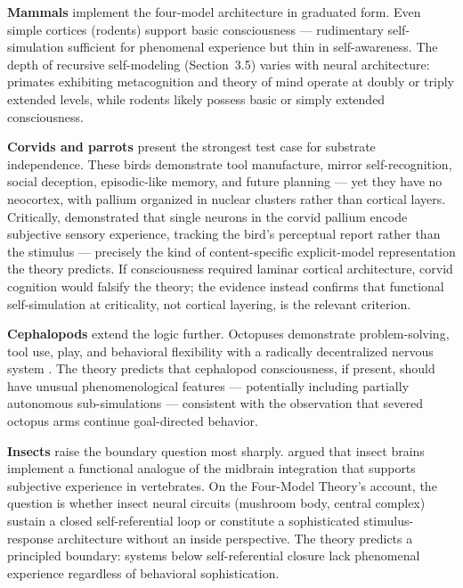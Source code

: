 \documentclass[12pt]{article}
\begin{document}
\textbf{Mammals} implement the four-model architecture in graduated form. Even simple cortices (rodents) support basic consciousness --- rudimentary self-simulation sufficient for phenomenal experience but thin in self-awareness. The depth of recursive self-modeling (Section~3.5) varies with neural architecture: primates exhibiting metacognition and theory of mind operate at doubly or triply extended levels, while rodents likely possess basic or simply extended consciousness.

\textbf{Corvids and parrots} present the strongest test case for substrate independence. These birds demonstrate tool manufacture, mirror self-recognition, social deception, episodic-like memory, and future planning \citep{Gunturkun2016} --- yet they have no neocortex, with pallium organized in nuclear clusters rather than cortical layers. Critically, \citet{Nieder2020} demonstrated that single neurons in the corvid pallium encode subjective sensory experience, tracking the bird's perceptual report rather than the stimulus --- precisely the kind of content-specific explicit-model representation the theory predicts. If consciousness required laminar cortical architecture, corvid cognition would falsify the theory; the evidence instead confirms that functional self-simulation at criticality, not cortical layering, is the relevant criterion.

\textbf{Cephalopods} extend the logic further. Octopuses demonstrate problem-solving, tool use, play, and behavioral flexibility with a radically decentralized nervous system \citep{GodfreySmith2016}. The theory predicts that cephalopod consciousness, if present, should have unusual phenomenological features --- potentially including partially autonomous sub-simulations --- consistent with the observation that severed octopus arms continue goal-directed behavior.

\textbf{Insects} raise the boundary question most sharply. \citet{BarronKlein2016} argued that insect brains implement a functional analogue of the midbrain integration that supports subjective experience in vertebrates. On the Four-Model Theory's account, the question is whether insect neural circuits (mushroom body, central complex) sustain a closed self-referential loop or constitute a sophisticated stimulus-response architecture without an inside perspective. The theory predicts a principled boundary: systems below self-referential closure lack phenomenal experience regardless of behavioral sophistication.
\end{document}
